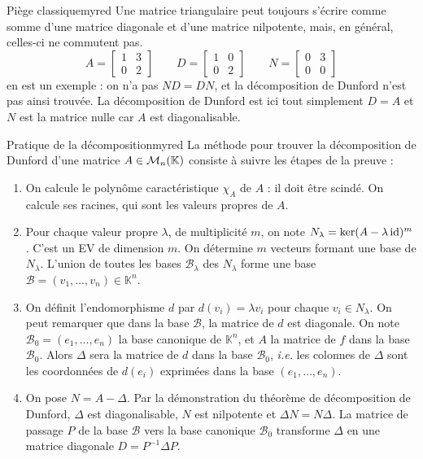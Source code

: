    \begin{omed}{Piège classique}{myred}
        Une matrice triangulaire peut toujours s’écrire comme somme d’une matrice diagonale et d’une matrice nilpotente, mais, en général, celles-ci ne commutent pas. 
        \[ A = \begin{bmatrix}
            1 & 3 \\
            0 & 2
        \end{bmatrix} \qquad D = \begin{bmatrix}
            1 & 0 \\
            0 & 2
        \end{bmatrix} \qquad N = \begin{bmatrix}
            0 & 3 \\
            0 & 0
        \end{bmatrix} \]   
        en est un exemple : on n’a pas $ND = DN$, et la décomposition de Dunford n’est pas ainsi trouvée. La décomposition de Dunford est ici tout simplement $D = A$ et $N$ est la matrice nulle car $A$ est diagonalisable.
    \end{omed}

    \begin{omed}{Pratique de la décomposition}{myred}
        La méthode pour trouver la décomposition de Dunford d’une matrice $A \in \mathcal{M}_{n}(\mathbb{K})$ consiste à suivre les étapes de la preuve : 
        \begin{enumerate}
            \item On calcule le polynôme caractéristique $\chi_A$ de $A$ : il doit être scindé. On calcule ses racines, qui sont les valeurs propres de $A$.
            \item Pour chaque valeur propre $\lambda$, de multiplicité $m$, on note $N_{\lambda} = \ker(A - \lambda \operatorname{id})^m$. C’est un EV de dimension $m$. On détermine $m$ vecteurs formant une base de $N_{\lambda}$. L’union de toutes les bases $\mathcal{B}_{\lambda}$ des $N_{\lambda}$ forme une base $\mathcal{B} = (v_1,\ldots, v_n) \in \mathbb{K}^n$.
            \item On définit l’endomorphisme $d$ par $d(v_i) = \lambda v_i$ pour chaque $v_i \in N_{\lambda}$. On peut remarquer que dans la base $\mathcal{B}$, la matrice de $d$ est diagonale. On note $\mathcal{B}_0 = (e_1,\ldots,e_n)$ la base canonique de $\mathbb{K}^n$, et $A$ la matrice de $f$ dans la base $\mathcal{B}_0$. Alors $\Delta$ sera la matrice de $d$ dans la base $\mathcal{B}_0$, \textit{i.e.} les colonnes de $\Delta$ sont les coordonnées de $d(e_i)$ exprimées dans la base $(e_1,\ldots, e_n)$. 
            \item On pose $N = A - \Delta$. Par la démonstration du théorème de décomposition de Dunford, $\Delta$ est diagonalisable, $N$ est nilpotente et $\Delta N = N \Delta$. La matrice de passage $P$ de la base $\mathcal{B}$ vers la base canonique $\mathcal{B}_0$ transforme $\Delta$ en une matrice diagonale $D = P^{-1} \Delta P$.
        \end{enumerate}
    \end{omed}

